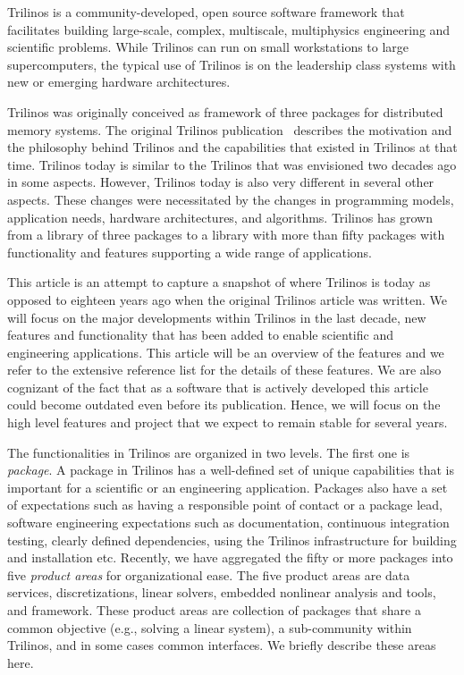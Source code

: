

Trilinos is a community-developed, open source software framework that facilitates building large-scale, complex, multiscale, multiphysics engineering and scientific problems. While Trilinos can run on small workstations to large supercomputers, the typical use of Trilinos is on the leadership class systems with new or emerging hardware architectures.

Trilinos was originally conceived as framework of three packages for distributed memory systems. The original Trilinos publication~\cite{Heroux2005a} describes the motivation and the philosophy behind Trilinos and the capabilities that existed in Trilinos at that time. Trilinos today is similar to the Trilinos that was envisioned two decades ago in some aspects. However, Trilinos today is also very different in several other aspects. These changes were necessitated by the changes in programming models, application needs, hardware architectures, and algorithms. Trilinos has grown from a library of three packages to a library with more than fifty packages with functionality and features supporting a wide range of applications.

This article is an attempt to capture a snapshot of where Trilinos is today as opposed to eighteen years ago when the original Trilinos article was written. We will focus on the major developments within Trilinos in the last decade, new features and functionality that has been added to enable scientific and engineering applications. This article will be an overview of the features and we refer to the extensive reference list for the details of these features. We are also cognizant of the fact that as a software that is actively developed this article could become outdated even before its publication. Hence, we will focus on the high level features and project that we expect to remain stable for several years.

The functionalities in Trilinos are organized in two levels. The first one is \textit{package}. A package in Trilinos has a well-defined set of unique capabilities that is important for a scientific or an engineering application. Packages also have a set of expectations such as having a responsible point of contact or a package lead, software engineering expectations such as documentation, continuous integration testing, clearly defined dependencies, using the Trilinos infrastructure for building and installation etc. Recently, we have aggregated the fifty or more packages into five \textit{product areas} for organizational ease. The five product areas are data services, discretizations, linear solvers, embedded nonlinear analysis and tools, and framework. These product areas are collection of packages that share a common objective (e.g., solving a linear system), a sub-community within Trilinos, and in some cases common interfaces. We briefly describe these areas here.

